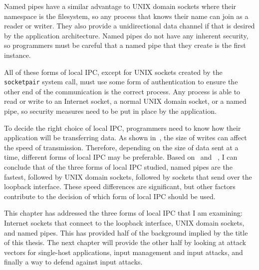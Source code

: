 Named pipes have a similar advantage to UNIX domain sockets where their namespace is the filesystem, so any process that knows their name can join as a reader or writer.  They also provide a unidirectional data channel if that is desired by the application architecture.  Named pipes do not have any inherent security, so programmers must be careful that a named pipe that they create is the first instance.

All of these forms of local IPC, except for UNIX sockets created by the \texttt{socketpair} system call, must use some form of authentication to ensure the other end of the communication is the correct process.  Any process is able to read or write to an Internet socket, a normal UNIX domain socket, or a named pipe, so security measures need to be put in place by the application.

To decide the right choice of local IPC, programmers need to know how their application will be transferring data.  As shown in~\cite{Xiurong2011TheAA}, the size of writes can affect the speed of transmission.  Therefore, depending on the size of data sent at a time, different forms of local IPC may be preferable.  Based on~\cite{immich2003performance} and ~\cite{Stevens:1997:UNP:522800}, I can conclude that of the three forms of local IPC studied, named pipes are the fastest, followed by UNIX domain sockets, followed by sockets that send over the loopback interface.  These speed differences are significant, but other factors contribute to the decision of which form of local IPC should be used.

This chapter has addressed the three forms of local IPC that I am examining: Internet sockets that connect to the loopback interface, UNIX domain sockets, and named pipes.  This has provided half of the background implied by the title of this thesis.  The next chapter will provide the other half by looking at attack vectors for single-host applications, input management and input attacks, and finally a way to defend against input attacks.
